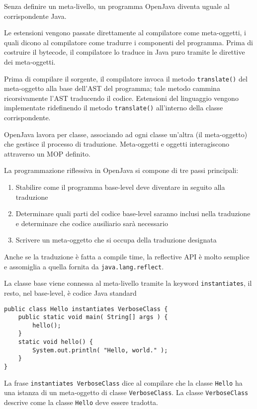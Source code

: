 Senza definire un meta-livello, un programma OpenJava diventa uguale al corrispondente Java.

Le estensioni vengono passate direttamente al compilatore come meta-oggetti, i quali dicono al compilatore come tradurre i componenti del programma. Prima di costruire il bytecode, il compilatore lo traduce in Java puro tramite le direttive dei meta-oggetti.

Prima di compilare il sorgente, il compilatore invoca il metodo \texttt{translate()} del meta-oggetto alla base dell'AST del programma; tale metodo cammina ricorsivamente l'AST traducendo il codice. Estensioni del linguaggio vengono implementate ridefinendo il metodo \texttt{translate()} all'interno della classe corrispondente.

OpenJava lavora per classe, associando ad ogni classe un'altra (il meta-oggetto) che gestisce il processo di traduzione. Meta-oggetti e oggetti interagiscono attraverso un MOP definito.

La programmazione riflessiva in OpenJava si compone di tre passi principali:
\begin{enumerate}
    \item Stabilire come il programma base-level deve diventare in seguito alla traduzione

    \item Determinare quali parti del codice base-level saranno inclusi nella traduzione e determinare che codice ausiliario sarà necessario

    \item Scrivere un meta-oggetto che si occupa della traduzione designata
\end{enumerate}
Anche se la traduzione è fatta a compile time, la reflective API è molto semplice e assomiglia a quella fornita da \texttt{java.lang.reflect}.

La classe base viene connessa al meta-livello tramite la keyword \texttt{instantiates}, il resto, nel base-level, è codice Java standard
\begin{verbatim}
public class Hello instantiates VerboseClass {
    public static void main( String[] args ) {
        hello();
    }
    static void hello() {
        System.out.println( "Hello, world." );
    }
}
\end{verbatim}
La frase \texttt{instantiates VerboseClass} dice al compilare che la classe \texttt{Hello} ha una istanza di un meta-oggetto di classe \texttt{VerboseClass}. La classe \texttt{VerboseClass} descrive come la classe \texttt{Hello} deve essere tradotta.

